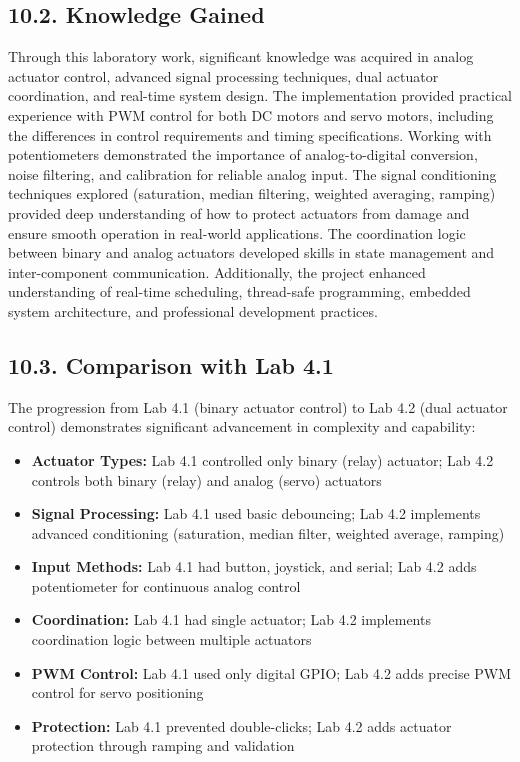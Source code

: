 \documentclass[12pt]{article}
\begin{document}
\subsection*{10.2. Knowledge Gained}

Through this laboratory work, significant knowledge was acquired in analog actuator control, advanced signal processing techniques, dual actuator coordination, and real-time system design. The implementation provided practical experience with PWM control for both DC motors and servo motors, including the differences in control requirements and timing specifications. Working with potentiometers demonstrated the importance of analog-to-digital conversion, noise filtering, and calibration for reliable analog input. The signal conditioning techniques explored (saturation, median filtering, weighted averaging, ramping) provided deep understanding of how to protect actuators from damage and ensure smooth operation in real-world applications. The coordination logic between binary and analog actuators developed skills in state management and inter-component communication. Additionally, the project enhanced understanding of real-time scheduling, thread-safe programming, embedded system architecture, and professional development practices.

\subsection*{10.3. Comparison with Lab 4.1}

The progression from Lab 4.1 (binary actuator control) to Lab 4.2 (dual actuator control) demonstrates significant advancement in complexity and capability:

\begin{itemize}
    \item \textbf{Actuator Types:} Lab 4.1 controlled only binary (relay) actuator; Lab 4.2 controls both binary (relay) and analog (servo) actuators
    \item \textbf{Signal Processing:} Lab 4.1 used basic debouncing; Lab 4.2 implements advanced conditioning (saturation, median filter, weighted average, ramping)
    \item \textbf{Input Methods:} Lab 4.1 had button, joystick, and serial; Lab 4.2 adds potentiometer for continuous analog control
    \item \textbf{Coordination:} Lab 4.1 had single actuator; Lab 4.2 implements coordination logic between multiple actuators
    \item \textbf{PWM Control:} Lab 4.1 used only digital GPIO; Lab 4.2 adds precise PWM control for servo positioning
    \item \textbf{Protection:} Lab 4.1 prevented double-clicks; Lab 4.2 adds actuator protection through ramping and validation
\end{itemize}
\end{document}
